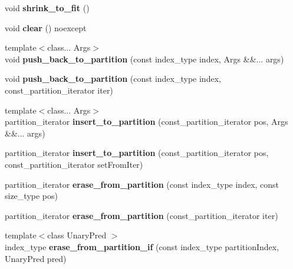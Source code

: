\begin{DoxyCompactItemize}
void {\bfseries shrink\+\_\+to\+\_\+fit} ()
\item 
\mbox{\label{classsequoia_1_1data__structures_1_1contiguous__storage_a086ff5af28ec53d2ca6dd49f70d401f7}} 
void {\bfseries clear} () noexcept
\item 
\mbox{\label{classsequoia_1_1data__structures_1_1contiguous__storage_a7b2930364c984ebff76d7751b140a91c}} 
{\footnotesize template$<$class... Args$>$ }\\void {\bfseries push\+\_\+back\+\_\+to\+\_\+partition} (const index\+\_\+type index, Args \&\&... args)
\item 
\mbox{\label{classsequoia_1_1data__structures_1_1contiguous__storage_a86f40afb375ac23005ec03e3850967f2}} 
void {\bfseries push\+\_\+back\+\_\+to\+\_\+partition} (const index\+\_\+type index, const\+\_\+partition\+\_\+iterator iter)
\item 
\mbox{\label{classsequoia_1_1data__structures_1_1contiguous__storage_ac0c428965c2e5ba9e86756109ea98d1d}} 
{\footnotesize template$<$class... Args$>$ }\\partition\+\_\+iterator {\bfseries insert\+\_\+to\+\_\+partition} (const\+\_\+partition\+\_\+iterator pos, Args \&\&... args)
\item 
\mbox{\label{classsequoia_1_1data__structures_1_1contiguous__storage_a141cb4205c2461bd3aa702249638104f}} 
partition\+\_\+iterator {\bfseries insert\+\_\+to\+\_\+partition} (const\+\_\+partition\+\_\+iterator pos, const\+\_\+partition\+\_\+iterator set\+From\+Iter)
\item 
\mbox{\label{classsequoia_1_1data__structures_1_1contiguous__storage_a50a7542acf13fd539e6aeb63e071b8f1}} 
partition\+\_\+iterator {\bfseries erase\+\_\+from\+\_\+partition} (const index\+\_\+type index, const size\+\_\+type pos)
\item 
\mbox{\label{classsequoia_1_1data__structures_1_1contiguous__storage_a20f7bc244b6652cacbeded3d5dfd405b}} 
partition\+\_\+iterator {\bfseries erase\+\_\+from\+\_\+partition} (const\+\_\+partition\+\_\+iterator iter)
\item 
\mbox{\label{classsequoia_1_1data__structures_1_1contiguous__storage_af45eb63a7411e9ae4870ac6f6b84b706}} 
{\footnotesize template$<$class Unary\+Pred $>$ }\\index\+\_\+type {\bfseries erase\+\_\+from\+\_\+partition\+\_\+if} (const index\+\_\+type partition\+Index, Unary\+Pred pred)
\end{DoxyCompactItemize}
